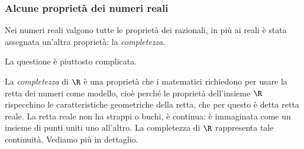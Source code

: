 \subsubsection{Alcune proprietà dei numeri reali} 
\label{subsubsec:insnum_reali}

% 
% 


Nei numeri reali valgono tutte le proprietà dei razionali, in più ai reali è 
stata assegnata un'altra proprietà: la \emph{completezza}.

La questione è piuttosto complicata. 


La \emph{completezza} di \(\R\) è una proprietà che i matematici richiedono per 
usare la retta dei numeri come modello, cioè perché le proprietà dell'insieme 
\(\R\) rispecchino le caratteristiche geometriche della retta, che per questo è 
detta retta reale. La retta reale non ha strappi o buchi, è continua: è 
immaginata come un insieme di punti uniti uno all'altro. La completezza di 
\(\R\) rappresenta tale continuità. Vediamo più in dettaglio.

